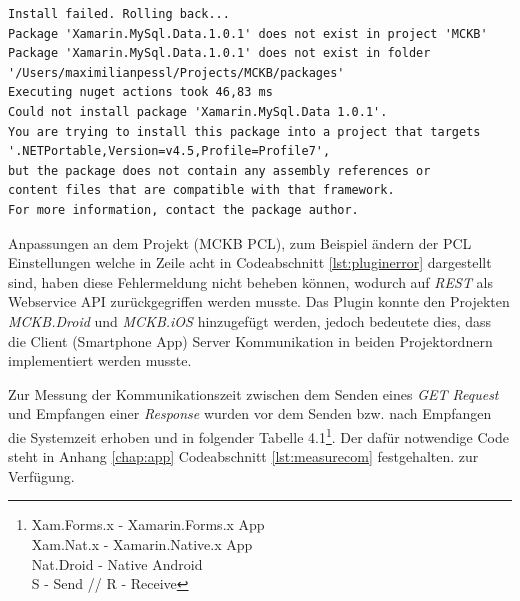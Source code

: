 	\begin{lstlisting}[caption={Fehlermeldung - Plugin Installation},label={lst:pluginerror},captionpos=b,style=SQL-Michalstyle]
Install failed. Rolling back...
Package 'Xamarin.MySql.Data.1.0.1' does not exist in project 'MCKB'
Package 'Xamarin.MySql.Data.1.0.1' does not exist in folder 
'/Users/maximilianpessl/Projects/MCKB/packages'
Executing nuget actions took 46,83 ms
Could not install package 'Xamarin.MySql.Data 1.0.1'. 
You are trying to install this package into a project that targets 
'.NETPortable,Version=v4.5,Profile=Profile7', 
but the package does not contain any assembly references or 
content files that are compatible with that framework. 
For more information, contact the package author.
	\end{lstlisting}

	Anpassungen an dem Projekt (MCKB PCL), zum Beispiel ändern der PCL Einstellungen welche in Zeile acht in Codeabschnitt \ref{lst:pluginerror} dargestellt sind, haben diese Fehlermeldung nicht beheben können, wodurch auf \textit{REST} als Webservice API zurückgegriffen werden musste. Das Plugin konnte den Projekten \textit{MCKB.Droid} und \textit{MCKB.iOS} hinzugefügt werden, jedoch bedeutete dies, dass die Client (Smartphone App) Server Kommunikation in beiden Projektordnern implementiert werden musste.

	Zur Messung der Kommunikationszeit zwischen dem Senden eines \textit{GET Request} und Empfangen einer \textit{Response} wurden vor dem Senden bzw. nach Empfangen die Systemzeit erhoben und in folgender Tabelle 4.1\footnote{Xam.Forms.x - Xamarin.Forms.x App \\Xam.Nat.x - Xamarin.Native.x App \\Nat.Droid - Native Android\\ S - Send // R - Receive}. Der dafür notwendige Code steht in Anhang \ref{chap:app} Codeabschnitt \ref{lst:measurecom} festgehalten. zur Verfügung.


